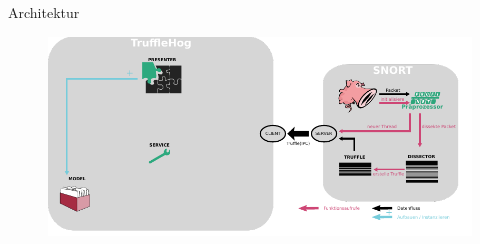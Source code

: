 \begin{frame}{Architektur}
    \begin{figure}
    	\centering
    	\includegraphics[width=\textwidth]{./images/10.pdf}
    \end{figure}
\end{frame}
